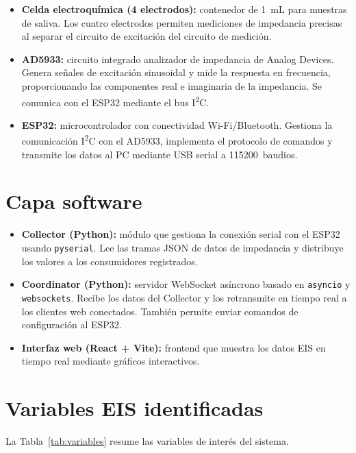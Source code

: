 \documentclass[11pt,a4paper,spanish]{book}
\begin{document}
\begin{itemize}
	\item \textbf{Celda electroqu\'{i}mica (4 electrodos):} contenedor de 1~mL para muestras de saliva. Los cuatro electrodos permiten mediciones de impedancia precisas al separar el circuito de excitaci\'{o}n del circuito de medici\'{o}n.
	\item \textbf{AD5933:} circuito integrado analizador de impedancia de Analog Devices. Genera se\~{n}ales de excitaci\'{o}n sinusoidal y mide la respuesta en frecuencia, proporcionando las componentes real e imaginaria de la impedancia. Se comunica con el ESP32 mediante el bus I\textsuperscript{2}C.
	\item \textbf{ESP32:} microcontrolador con conectividad Wi-Fi/Bluetooth. Gestiona la comunicaci\'{o}n I\textsuperscript{2}C con el AD5933, implementa el protocolo de comandos y transmite los datos al PC mediante USB serial a 115200~baudios.
\end{itemize}

\section{Capa software}
\begin{itemize}
	\item \textbf{Collector (Python):} m\'{o}dulo que gestiona la conexi\'{o}n serial con el ESP32 usando \texttt{pyserial}. Lee las tramas JSON de datos de impedancia y distribuye los valores a los consumidores registrados.
	\item \textbf{Coordinator (Python):} servidor WebSocket as\'{i}ncrono basado en \texttt{asyncio} y \texttt{websockets}. Recibe los datos del Collector y los retransmite en tiempo real a los clientes web conectados. Tambi\'{e}n permite enviar comandos de configuraci\'{o}n al ESP32.
	\item \textbf{Interfaz web (React + Vite):} frontend que muestra los datos EIS en tiempo real mediante gr\'{a}ficos interactivos.
\end{itemize}

\section{Variables EIS identificadas}

La Tabla~\ref{tab:variables} resume las variables de inter\'{e}s del sistema.
\end{document}

